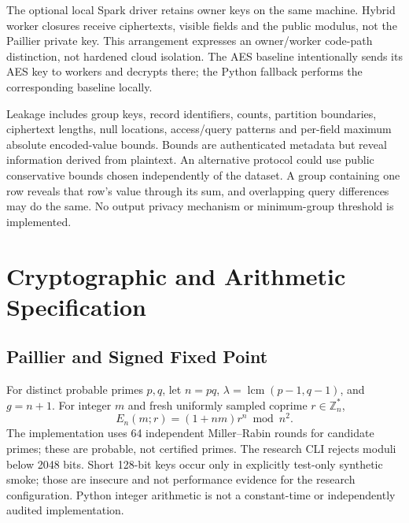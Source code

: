 \documentclass[conference]{IEEEtran}
\begin{document}
The optional local Spark driver retains owner keys on the same machine. Hybrid worker closures receive ciphertexts, visible fields and the public modulus, not the Paillier private key. This arrangement expresses an owner/worker code-path distinction, not hardened cloud isolation. The AES baseline intentionally sends its AES key to workers and decrypts there; the Python fallback performs the corresponding baseline locally.

Leakage includes group keys, record identifiers, counts, partition boundaries, ciphertext lengths, null locations, access/query patterns and per-field maximum absolute encoded-value bounds. Bounds are authenticated metadata but reveal information derived from plaintext. An alternative protocol could use public conservative bounds chosen independently of the dataset. A group containing one row reveals that row's value through its sum, and overlapping query differences may do the same. No output privacy mechanism or minimum-group threshold is implemented.

\section{Cryptographic and Arithmetic Specification}
\subsection{Paillier and Signed Fixed Point}
For distinct probable primes $p,q$, let $n=pq$, $\lambda=\operatorname{lcm}(p-1,q-1)$, and $g=n+1$. For integer $m$ and fresh uniformly sampled coprime $r\in\mathbb{Z}_n^*$,
\begin{equation}
E_n(m;r)=(1+nm)r^n\bmod n^2.
\end{equation}
The implementation uses 64 independent Miller--Rabin rounds for candidate primes; these are probable, not certified primes. The research CLI rejects moduli below 2048 bits. Short 128-bit keys occur only in explicitly test-only synthetic smoke; those are insecure and not performance evidence for the research configuration. Python integer arithmetic is not a constant-time or independently audited implementation.
\end{document}

